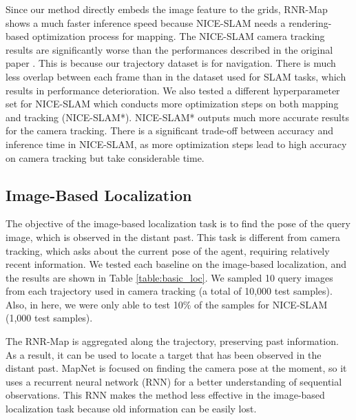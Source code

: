 \documentclass[10pt,twocolumn,letterpaper]{article}
\def\proposed{RNR-Map\xspace}
\begin{document}
Since our method directly embeds the image feature to the grids, \proposed shows a much faster inference speed because NICE-SLAM needs a rendering-based optimization process for mapping.
%
The NICE-SLAM camera tracking results are significantly worse than the performances described in the original paper \cite{nice-slam}. 
%
This is because our trajectory dataset is for navigation.
%
There is much less overlap between each frame than in the dataset used for SLAM tasks, which results in performance deterioration.
%
We also tested a different hyperparameter set for NICE-SLAM which conducts more optimization steps on both mapping and tracking (NICE-SLAM*). 
%
NICE-SLAM* outputs much more accurate results for the camera tracking.
%
There is a significant trade-off between accuracy and inference time in NICE-SLAM, as more optimization steps lead to high accuracy on camera tracking but take considerable time.


\subsection{Image-Based Localization}\label{appendix:exp_loc:loc}
%
The objective of the image-based localization task is to find the pose of the query image, which is observed in the distant past.
%
This task is different from camera tracking, which asks about the current pose of the agent, requiring relatively recent information.
%
We tested each baseline on the image-based localization, and the results are shown in Table \ref{table:basic_loc}.
%
We sampled 10 query images from each trajectory used in camera tracking (a total of 10,000 test samples).
%
Also, in here, we were only able to test 10\% of the samples for NICE-SLAM (1,000 test samples).

The \proposed is aggregated along the trajectory, preserving past information.
%
As a result, it can be used to locate a target that has been observed in the distant past.
%
MapNet \cite{MapNet} is focused on finding the camera pose at the moment, so it uses a recurrent neural network (RNN) for a better understanding of sequential observations.
%
This RNN makes the method less effective in the image-based localization task because old information can be easily lost.
%
\end{document}

